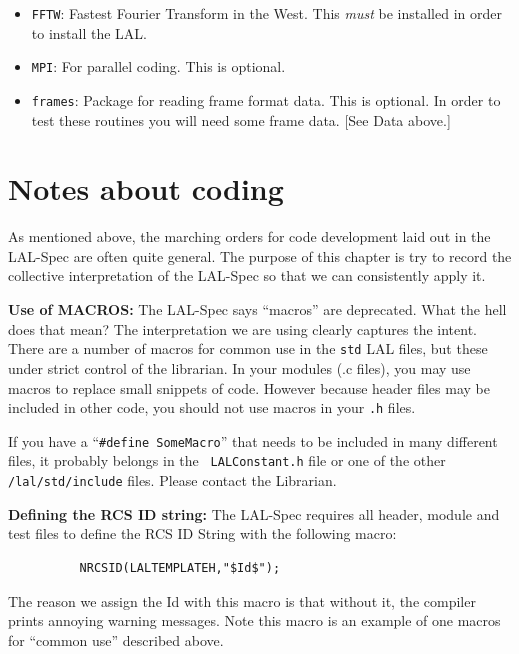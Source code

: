 \documentclass[oneside]{book}
\begin{document}
\begin{itemize}
\begin{itemize}
          \vspace*{-0.051in}
          \item {\texttt {FFTW}}:  Fastest Fourier Transform in the West.
          This {\it must} be installed in order to install the LAL.
          \vspace*{-0.051in}
          \item {\texttt {MPI}}:  For parallel coding. This is
          optional.
          \vspace*{-0.051in}
          \item {\texttt {frames}}: Package for reading frame format data.
          This is optional.
          In order to test these routines you will need some frame
          data. [See Data above.]
    \end{itemize} 
\end{itemize}

\chapter{Notes about coding}
\label{c:CodingNotes}

As mentioned above,  the marching orders for code development laid out
in the LAL-Spec are often quite general.  The purpose of this chapter
is try to record the collective interpretation of the LAL-Spec so that
we can consistently apply it.

\bigskip

{\noindent \bf Use of MACROS:} The LAL-Spec says ``macros'' are
deprecated.  What the hell does that mean? The interpretation we are
using clearly captures the intent.  There are a number of macros for
common use in the {\tt std} LAL files, but these under strict control
of the librarian.  In your modules (.c files), you may use macros to
replace small snippets of code.  However because header files may be
included in other code, you should not use macros in your {\tt .h}
files.

If you have a ``{\texttt {\#define SomeMacro}}'' that needs to be
included in many different files, it probably belongs in the {\tt
LALConstant.h} file or one of the other {\tt /lal/std/include} files.
Please contact the Librarian.

\bigskip

{\noindent \bf Defining the RCS ID string:}  The LAL-Spec 
requires all header, module and test files to define the
RCS ID String with the following macro: 
\begin{verbatim}
          NRCSID(LALTEMPLATEH,"$Id$");
\end{verbatim}
\noindent The reason we assign the Id with this macro is that without it,
the compiler prints annoying warning messages. Note this macro is an
example of one macros for ``common use'' described above.
\end{document}
